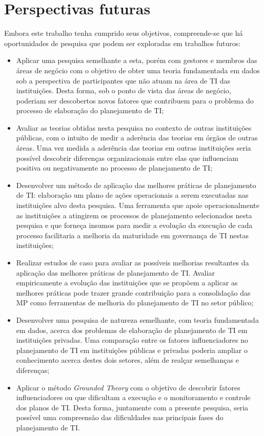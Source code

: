 \section{Perspectivas futuras}

Embora este trabalho tenha cumprido seus objetivos, compreende-se que há oportunidades de pesquisa que podem ser exploradas em trabalhos futuros:

\begin{itemize}
\item Aplicar uma pesquisa semelhante a esta, porém com gestores e membros das áreas de negócio com o objetivo de obter uma teoria fundamentada em dados sob a perspectiva de participantes que não atuam na área de TI das instituições. Desta forma, sob o ponto de vista das áreas de negócio, poderiam ser descobertos novos fatores que contribuem para o problema do processo de elaboração do planejamento de TI;
\item Avaliar as teorias obtidas nesta pesquisa no contexto de outras instituições públicas, com o intuito de medir a aderência das teorias em órgãos de outras áreas. Uma vez medida a aderência das teorias em outras instituições seria possível descobrir diferenças organizacionais entre elas que influenciam positiva ou negativamente no processo de planejamento de TI;
\item Desenvolver um método de aplicação das melhores práticas de planejamento de TI: elaboração um plano de ações operacionais a serem executadas nas instituições alvo desta pesquisa. Uma ferramenta que apoie operacionalmente as instituições a atingirem os processos de planejamento selecionados nesta pesquisa e que forneça insumos para medir a evolução da execução de cada processo facilitaria a melhoria da maturidade em governança de TI nestas instituições;
\item Realizar estudos de caso para avaliar as possíveis melhorias resultantes da aplicação das melhores práticas de planejamento de TI. Avaliar empiricamente a evolução das instituições que se propõem a aplicar as melhores práticas pode trazer grande contribuição para a consolidação das MP como ferramentas de melhoria do planejamento de TI no setor público;
\item Desenvolver uma pesquisa de natureza semelhante, com teoria fundamentada em dados, acerca dos problemas de elaboração de planejamento de TI em instituições privadas. Uma comparação entre os fatores influenciadores no planejamento de TI em instituições públicas e privadas poderia ampliar o conhecimento acerca destes dois setores, além de realçar semelhanças e diferenças;
\item Aplicar o método \textit{Grounded Theory} com o objetivo de descobrir fatores influenciadores ou que dificultam a execução e o monitoramento e controle dos planos de TI. Desta forma, juntamente com a presente pesquisa, seria possível uma compreensão das dificuldades nas principais fases do planejamento de TI.
\end{itemize}
